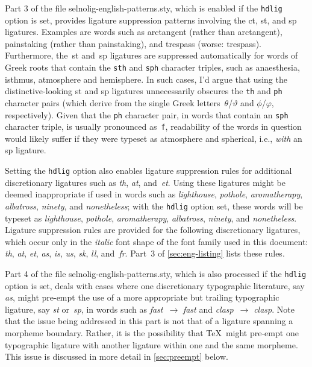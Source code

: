 \documentclass[11pt]{article}
\newcommand{\pkg}[1]{\textsf{#1}}
\newcommand{\opt}[1]{\texttt{#1}}
\begin{document}
Part 3 of the file \pkg{selnolig-english-patterns.sty}, which is enabled if the \opt{hdlig} option is set, provides ligature suppression patterns involving the \mbox{ct}, \mbox{st}, and \mbox{sp} ligatures. Examples are words such as arctangent (rather than ar\mbox{ct}angent), painstaking (rather than pain\mbox{st}aking), and trespass (worse: tre\mbox{sp}ass). Furthermore, the~st and~sp ligatures are suppressed automatically for words of Greek roots that contain the \opt{sth} and \opt{sph} character triples, such as anaesthesia, isthmus, atmosphere and hemisphere. In such cases, I'd argue that using the distinctive-looking st and sp ligatures unnecessarily obscures the \opt{th} and \opt{ph} character pairs (which derive from the single Greek letters~$\theta$/$\vartheta$ and $\phi$/$\varphi$, respectively). Given that the \opt{ph} character pair, in words that contain an \opt{sph} character triple, is usually pronounced as~\opt{f}, readability of the words in question would likely suffer if they were typeset as atmo\mbox{sp}here and \mbox{sp}herical, i.e., \emph{with} an sp ligature.

Setting the \opt{hdlig} option also enables ligature suppression rules for additional discretionary ligatures such as \emph{th}, \emph{at}, and~\emph{et}. Using these ligatures might be deemed inappropriate if used in words such as \emph{ligh\mbox{th}ouse}, \emph{po\mbox{th}ole}, \emph{arom\mbox{at}herapy}, \emph{alb\mbox{at}ross}, \emph{nin\mbox{et}y}, and \emph{non\mbox{et}heless}; with the \opt{hdlig} option set, these words will be typeset as \emph{lighthouse}, \emph{pothole}, \emph{aromatherapy}, \emph{albatross}, \emph{ninety}, and \emph{nonetheless}. Ligature suppression rules are provided for the following discretionary ligatures, which occur only in the \emph{italic} font shape of the font family used in this document: \emph{th}, \emph{at}, \emph{et}, \emph{as}, \emph{is}, \emph{us}, {\ebg \emph{sk}}, \emph{ll}, and~\emph{fr}. Part~3 of \cref{sec:eng-listing} lists these rules.

Part 4 of the file \pkg{selnolig-english-patterns.sty}, which is also processed if the \opt{hdlig} option is set, deals with cases where one discretionary typographic literature, say \emph{as}, might pre-empt the use of a more appropriate but trailing typographic ligature, say \emph{st} or~\emph{sp}, in words such as \emph{f\mbox{as}t}~$\to$ \emph{fa\mbox{st}} and \emph{cl\mbox{as}p}~$\to$ \emph{cla\mbox{sp}}. Note that the issue being addressed in this part is not that of a ligature spanning a morpheme boundary. Rather, it is the possibility that \TeX\ might pre-empt one typographic ligature with another ligature within one and the same morpheme. This issue is discussed in more detail in \cref{sec:preempt} below.
\end{document}
